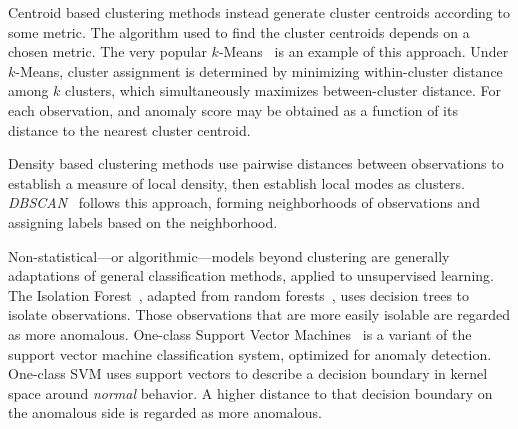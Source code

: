 Centroid based clustering methods instead generate cluster centroids 
    according to some metric.  The algorithm used to find the cluster centroids 
    depends on a chosen metric.  The very popular $k$-Means~\citep{hartigan1979} 
    is an example of this approach. Under $k$-Means, cluster assignment is 
    determined by minimizing within-cluster distance among $k$ clusters, which 
    simultaneously maximizes between-cluster distance. For each observation, 
    and anomaly score may be obtained as a function of its distance to the 
    nearest cluster centroid.  
    
Density based clustering methods use pairwise distances between observations to 
    establish a measure of local density, then establish local modes as 
    clusters.  \emph{DBSCAN}~\citep{ester1996} follows this approach, forming 
    neighborhoods of observations and assigning labels based on the 
    neighborhood. 
    
Non-statistical---or algorithmic---models beyond clustering are generally adaptations 
    of general classification methods, applied to unsupervised learning.  
    The Isolation Forest~\citep{liu2000}, adapted from random 
    forests~\citep{breiman2001}, uses decision trees to isolate observations.
    Those observations that are more easily isolable are regarded as more 
    anomalous.  One-class Support Vector Machines~\citep{chang2011} is a variant
    of the support vector machine classification system, optimized for 
    anomaly detection.  One-class SVM uses support vectors to describe a 
    decision boundary in kernel space around \emph{normal} behavior. A higher 
    distance to that decision boundary on the anomalous side is regarded as 
    more anomalous.
    
